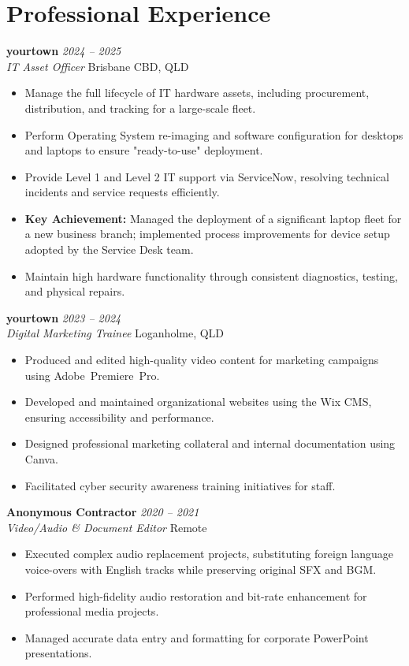 \documentclass[11pt, a4paper]{article}
\begin{document}
\section{Professional Experience}

\textbf{yourtown} \hfill \textit{2024 -- 2025} \\
\textit{IT Asset Officer} \hfill Brisbane CBD, QLD
\begin{itemize}
    \item Manage the full lifecycle of IT hardware assets, including procurement, distribution, and tracking for a large-scale fleet.
    \item Perform Operating System re-imaging and software configuration for desktops and laptops to ensure "ready-to-use" deployment.
    \item Provide Level 1 and Level 2 IT support via ServiceNow, resolving technical incidents and service requests efficiently.
    \item \textbf{Key Achievement:} Managed the deployment of a significant laptop fleet for a new business branch; implemented process improvements for device setup adopted by the Service Desk team.
    \item Maintain high hardware functionality through consistent diagnostics, testing, and physical repairs.
\end{itemize}

\vspace{6pt}

\textbf{yourtown} \hfill \textit{2023 -- 2024} \\
\textit{Digital Marketing Trainee} \hfill Loganholme, QLD
\begin{itemize}
    \item Produced and edited high-quality video content for marketing campaigns using \mbox{Adobe Premiere Pro}.
    \item Developed and maintained organizational websites using the Wix CMS, ensuring accessibility and performance.
    \item Designed professional marketing collateral and internal documentation using Canva.
    \item Facilitated cyber security awareness training initiatives for staff.
\end{itemize}

\newpage

\textbf{Anonymous Contractor} \hfill \textit{2020 -- 2021} \\
\textit{Video/Audio \& Document Editor} \hfill Remote
\begin{itemize}
    \item Executed complex audio replacement projects, substituting foreign language voice-overs with English tracks while preserving original SFX and BGM.
    \item Performed high-fidelity audio restoration and bit-rate enhancement for professional media projects.
    \item Managed accurate data entry and formatting for corporate PowerPoint presentations.
\end{itemize}
\end{document}
